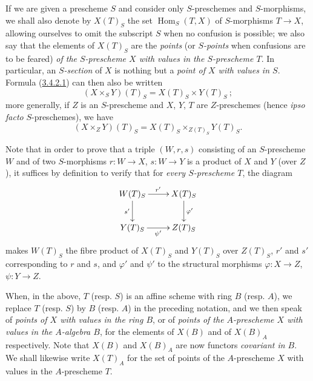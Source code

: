 \begin{env}[3.4.3]
\label{I.3.4.3}
If we are given a prescheme $S$ and consider only
$S$-preschemes and $S$-morphisms, we shall also denote by $X(T)_S$ the set
$\operatorname{Hom}_S(T,X)$ of $S$-morphisms $T\to X$, allowing ourselves to
omit the subscript $S$ when no confusion is possible; we also say
that the elements of $X(T)_S$ are the \emph{points} (or \emph{$S$-points}
when confusions are to be feared) \emph{of the $S$-prescheme $X$ with values
in the $S$-prescheme $T$}. In particular, an \emph{$S$-section} of $X$
is nothing but a \emph{point of $X$ with values in $S$}. Formula
(\hyperref[I.3.4.2.1]{3.4.2.1}) can then also be written
\[
  (X\times_S Y)(T)_S=X(T)_S\times Y(T)_S~;
  \tag{3.4.3.1}
\]
more generally, if $Z$ is an $S$-prescheme and $X$, $Y$, $T$ are
$Z$-preschemes (hence \emph{ipso facto} $S$-preschemes), we have
\[
  (X\times_Z Y)(T)_S=X(T)_S\times_{Z(T)_S}Y(T)_S.
  \tag{3.4.3.2}
\]

Note that in order to prove that a triple $(W,r,s)$ consisting of an
$S$-prescheme $W$ and of two $S$-morphisms $r:W\to X$, $s:W\to Y$ is a product
of $X$ and $Y$ (over $Z$), it suffices by definition to verify that for
\emph{every $S$-prescheme $T$}, the diagram
\label{I.3.4.3.product-diagram}
\[
  \xymatrix{
    W(T)_S\ar[r]^{r'}\ar[d]_{s'} & X(T)_S\ar[d]^{\varphi'}\\
    Y(T)_S\ar[r]_{\psi'} & Z(T)_S
  }
\]
makes $W(T)_S$ the fibre product of $X(T)_S$ and $Y(T)_S$ over
$Z(T)_S$, $r'$ and $s'$ corresponding to $r$ and $s$, and $\varphi'$ and
$\psi'$ to the structural morphisms $\varphi:X\to Z$, $\psi:Y\to Z$.
\end{env}

\begin{env}[3.4.4]
\label{I.3.4.4}
When, in the above, $T$ (resp. $S$) is an affine scheme with ring $B$
(resp. $A$), we replace $T$ (resp. $S$) by $B$ (resp. $A$) in the preceding
notation, and we then speak of \emph{points of $X$ with values in the ring
$B$}, or of \emph{points of the $A$-prescheme $X$ with values in the
$A$-algebra $B$}, for the elements of $X(B)$ and of $X(B)_A$ respectively.
Note that $X(B)$ and $X(B)_A$ are now functors \emph{covariant in $B$}. We
shall likewise write $X(T)_A$ for the set of points of the $A$-prescheme $X$
with values in the $A$-prescheme $T$.
\end{env}

